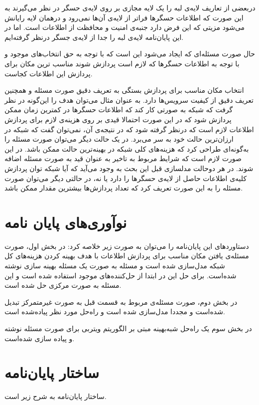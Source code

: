   دربعضی از تعاریف لایه‌ی لبه را یک لایه مجازی بر روی لایه‌ی حسگر در نظر می‌گیرند به این صورت که اطلاعات حسگرها فراتر از لایه‌ی آن‌ها نمی‌رود و درهمان لایه رایانش می‌شود مزیتی که این فرض دارد جنبه‌ی امنیت و محافظت از اطلاعات است. اما در این پایان‌نامه لایه‌ی لبه را جدا از لایه‌ی جسگر درنظر گرفته‌ایم. 
   
  حال صورت مسئله‌ای که ایجاد می‌شود این است که با توجه به حق انتخاب‌های موجود و با توجه به اطلاعات حسگرها که لازم است پردازش شوند مناسب ترین مکان برای پردازش این اطلاعات کجاست.
 
  انتخاب مکان مناسب برای پردازش بستگی به تعریف دقیق صورت مسئله و همچنین تعریف دقیق از کیفیت سرویس‌ها دارد. به عنوان مثال می‌توان هدف را این‌گونه در نظر گرفت که شبکه به صورتی کار کند که اطلاعات حسگرها در کمترین زمان ممکن پردازش شود که در این صورت احتمالا قیدی بر روی هزینه‌ی لازم برای پردازش اطلاعات لازم است که درنظر گرفته شود که در نتیجه‌ی آن، نمی‌توان گفت که شبکه در ارزان‌ترین حالت خود به سر می‌برد.
  در یک حالت دیگر می‌توان صورت مسئله را به‌گونه‌ای طراحی کرد که هزینه‌های کلی شبکه در بهینه‌ترین حالت ممکن باشد. در این صورت لازم است که شرایط مربوط به تاخیر به عنوان قید به صورت مسئله اضافه شوند. در هر دوحالت مدلسازی قبل این بحث به وجود می‌آید که آیا شبکه توان پردازش کلیه‌ی اطلاعات حاصل از لایه‌ی حسگرها را دارد یا نه، در حالتی دیگر می‌توان صورت مسئله را به این صورت تعریف کرد که تعداد پردازش‌ها بیشترین مقدار ممکن باشد. 

  \section{نو‌آوری‌های پایان نامه}
    دستاورد‌های این پایان‌نامه را می‌توان به صورت زیر خلاصه کرد:
    در بخش اول، صورت مسئله‌ی یافتن مکان مناسب برای پردازش اطلاعات با هدف بهینه کردن هزینه‌های کل شبکه مدل‌سازی شده است و مسئله به صورت یک مسئله بهینه سازی نوشته شده‌است. برای حل این در ابتدا از حل‌کننده‌های موجود استفاده شده است و این مسئله به صورت مرکزی حل شده است. 

    در بخش دوم، صورت مسئله‌‌ی مربوط به قسمت قبل به صورت غیرمتمرکز تبدیل شده‌است و مجددا مدل‌سازی شده است و راه‌حل مورد نظر پیاده‌شده است. 

    در بخش سوم یک راه‌حل شبه‌بهینه مبتی بر الگوریتم ویتربی برای صورت مسئله نوشته و پیاده سازی شده‌است. 

  \section{ساختار پایان‌نامه}
    ساختار پایان‌نامه به شرح زیر است.

